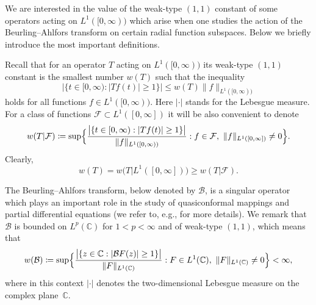 \documentclass[a4paper]{amsart} %
\theoremstyle{definition}
\theoremstyle{remark}
\numberwithin{equation}{section}
\newcommand*{\CC}{\mathbb{C}}
\newcommand*{\BA}{\mathcal{B}}
\newcommand*{\weakconst}[1]{w(#1)} %
\newcommand*{\weakconstrestricted}[2]{w(#1|#2)} %
\newcommand*{\weakconstrestrictedbig}[2]{w\bigl(#1\big|#2\bigr)} %
\begin{document}
We are interested in the value of the weak-type $(1,1)$ constant
of some operators acting on $L^1([0,\infty))$
which arise when one studies the  action of the Beurling--Ahlfors transform
on certain radial function subspaces.
Below we briefly introduce the most important definitions.

Recall that for an operator $T$ acting on $L^1([0,\infty))$ its weak-type $(1,1)$ constant
is the smallest number $\weakconst{T}$ such that the inequality
\begin{equation}
\label{eq:weak-type-def}
\bigl|\{t\in[0,\infty) : |T f(t)|\geq 1\} \bigr| \leq \weakconst{T} \|f\|_{L^1([0, \infty))}
\end{equation}
holds for all functions $f \in {L^1([0, \infty))}$. 
Here $|\cdot|$ stands for the Lebesgue measure.
For a class of functions $\mathcal{F}\subset L^1([0,\infty])$
it will be also convenient to denote
\begin{equation}
\label{eq:weak-type-def-restricted}
\weakconstrestricted{T}{\mathcal{F}} 
\coloneqq
\sup\Bigl\{ \frac{
\bigl|\{t\in[0,\infty) : |T f(t)|\geq 1\} \bigr|}{\|f\|_{L^1([0, \infty))}} :
f\in \mathcal{F},\ 
\|f\|_{L^1([0,\infty])}\neq 0 \Bigr\}.
\end{equation}
Clearly,
\[
\weakconst{T}
 = \weakconstrestrictedbig{T}{L^1([0,\infty])} \geq \weakconstrestricted{T}{\mathcal{F}}.
\]


The Beurling--Ahlfors transform, 
below denoted by $\BA$, is a singular operator 
which plays an important role in the study of quasiconformal mappings
 and partial differential equations
(we refer to, e.g., \cite{MR1294669, MR719167} for more details).
We remark that $\BA$ is bounded on $L^p(\CC)$ for $1<p<\infty$
and of weak-type $(1,1)$, which means that
\begin{equation*}
\weakconst{\BA} 
\coloneqq \sup\Bigl\{ \frac{
	\bigl|\{z\in \CC : |\BA F(z)|\geq 1\} \bigr| }{\|F\|_{L^1(\CC)}} :
F\in L^1(\CC),\ 
\|F\|_{L^1(\CC)}\neq 0 \Bigr\} < \infty,
\end{equation*}
where in this context $|\cdot|$ denotes  the two-dimensional Lebesgue measure on the complex plane~$\CC$.
\end{document}
